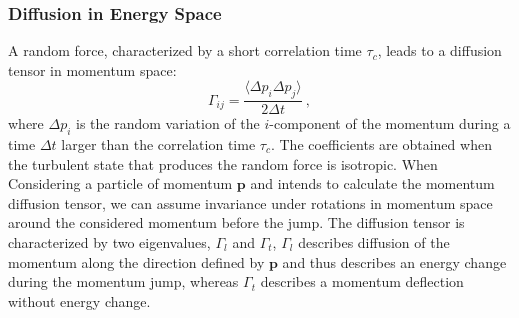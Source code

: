 \documentclass[12pt,a4paper]{article}
\renewcommand{\vec}[1]{\boldsymbol{#1}}
\begin{document}
\subsubsection{Diffusion in Energy Space}
A random force, characterized by a short correlation time $\tau_c$, leads to a diffusion tensor in momentum space:
\begin{equation}
\Gamma_{ij} = \frac{\langle \Delta p_i \Delta p_j \rangle}{2\Delta t} ~,
\end{equation}
where $\Delta p_i$ is the random variation of the $i$-component of the momentum during a time $ \Delta t$ larger than the correlation time $\tau_c$. The coefficients are obtained when the turbulent state that produces the random force is isotropic. When Considering a particle of momentum $\vec{p}$ and intends to calculate the momentum diffusion tensor, we can assume invariance under rotations in momentum space around the considered momentum before the jump. The diffusion tensor is characterized by two eigenvalues, $\Gamma_l$ and $\Gamma_t$, $\Gamma_l$ describes diffusion of the momentum along the direction defined by $\vec{p}$ and thus describes an energy change during the momentum jump, whereas $\Gamma_t$ describes a momentum deflection without energy change.
\end{document}
